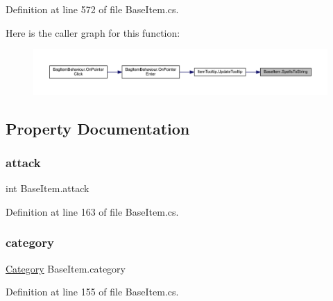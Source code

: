 Definition at line 572 of file Base\+Item.\+cs.

Here is the caller graph for this function\+:
\nopagebreak
\begin{figure}[H]
\begin{center}
\leavevmode
\includegraphics[width=350pt]{class_base_item_a7b49af5c45c493b9ea7319de44c6c138_icgraph}
\end{center}
\end{figure}


\subsection{Property Documentation}
\mbox{\label{class_base_item_a2b98fdf99b6c7ef2ae183c377245b133}} 
\subsubsection{\texorpdfstring{attack}{attack}}
{\footnotesize\ttfamily int Base\+Item.\+attack\hspace{0.3cm}{\ttfamily [get]}}



Definition at line 163 of file Base\+Item.\+cs.

\mbox{\label{class_base_item_a219878018445243d4fc30538548b7425}} 
\subsubsection{\texorpdfstring{category}{category}}
{\footnotesize\ttfamily \mbox{\hyperlink{class_base_item_a882a2962396f880c2e23755437245d37}{Category}} Base\+Item.\+category\hspace{0.3cm}{\ttfamily [get]}}



Definition at line 155 of file Base\+Item.\+cs.

\mbox{\label{class_base_item_a339e87b5b30b298bb683c01cba0cad1b}} 
